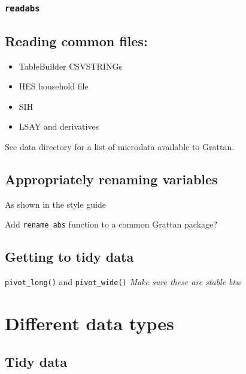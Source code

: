 \documentclass[]{book}
\providecommand{\tightlist}{%
  \setlength{\itemsep}{0pt}\setlength{\parskip}{0pt}}
\begin{document}
\hypertarget{readabs}{%
\subsection{\texorpdfstring{\texttt{readabs}}{readabs}}\label{readabs}}

\hypertarget{reading-common-files}{%
\section{Reading common files:}\label{reading-common-files}}

\begin{itemize}
\tightlist
\item
  TableBuilder CSVSTRINGs
\item
  HES household file
\item
  SIH
\item
  LSAY and derivatives
\end{itemize}

See data directory for a list of microdata available to Grattan.

\hypertarget{appropriately-renaming-variables}{%
\section{Appropriately renaming variables}\label{appropriately-renaming-variables}}

As shown in the style guide

Add \texttt{rename\_abs} function to a common Grattan package?

\hypertarget{getting-to-tidy-data}{%
\section{Getting to tidy data}\label{getting-to-tidy-data}}

\texttt{pivot\_long()} and \texttt{pivot\_wide()}
\emph{Make sure these are stable btw}

\hypertarget{different-data-types}{%
\chapter{Different data types}\label{different-data-types}}

\hypertarget{tidy-data}{%
\section{Tidy data}\label{tidy-data}}
\end{document}
